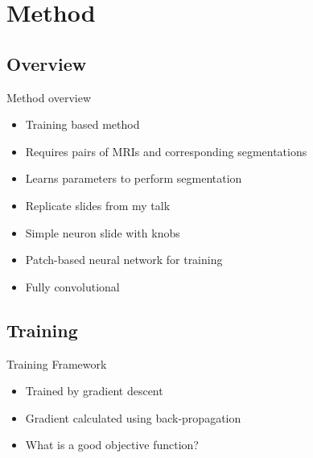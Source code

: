 \documentclass{beamer}
\begin{document}
\section{Method}

\subsection{Overview}

\begin{frame}{Method overview}
\begin{itemize}
\item Training based method
\item Requires pairs of MRIs and corresponding segmentations
\item Learns parameters to perform segmentation
\item Replicate slides from my talk
\item Simple neuron slide with knobs
\item Patch-based neural network for training
\item Fully convolutional
\end{itemize}
\end{frame}

\subsection{Training}

\begin{frame}{Training Framework}
\begin{itemize}
\item Trained by gradient descent
\item Gradient calculated using back-propagation
\item What is a good objective function?
\end{itemize}
\end{frame}
\end{document}
